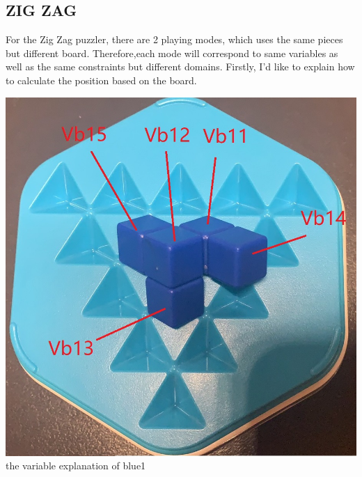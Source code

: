 \subsection{ZIG ZAG}
For the Zig Zag puzzler, there are 2 playing modes, which uses the same pieces but different board. Therefore,each mode will correspond to same variables as well as the same constraints but different domains.
Firstly, I'd like to explain how to calculate the position based on the board.
\begin{center}
\includegraphics[scale=0.2]{figs/3Dblue1.jpg}\\
the variable explanation of blue1\\
\end{center}
